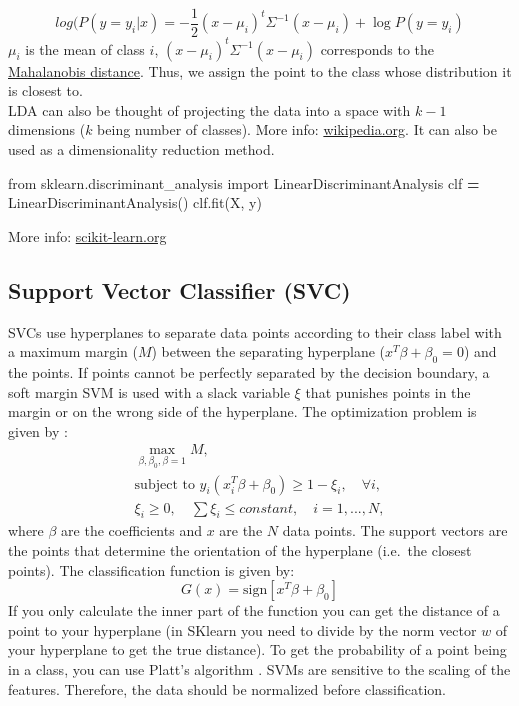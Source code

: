 \documentclass[
]{book}
\newenvironment{Shaded}{\begin{snugshade}}{\end{snugshade}}
\newcommand{\ImportTok}[1]{#1}
\newcommand{\NormalTok}[1]{#1}
\newcommand{\OperatorTok}[1]{\textcolor[rgb]{0.81,0.36,0.00}{\textbf{#1}}}
\begin{document}
\[log(P(y=y_i|x) = - \frac{1}{2} (x-\mu_i)^t \Sigma^{-1}(x-\mu_i)+\log P(y=y_i)\]
\(\mu_i\) is the mean of class \(i\), \((x-\mu_i)^t \Sigma^{-1}(x-\mu_i)\)
corresponds to the \href{https://en.wikipedia.org/wiki/Mahalanobis_distance}{Mahalanobis
distance}. Thus, we
assign the point to the class whose distribution it is closest to.\\
LDA can also be thought of projecting the data into a space with \(k-1\)
dimensions (\(k\) being number of classes). More info:
\href{https://en.wikipedia.org/wiki/Linear_discriminant_analysis}{wikipedia.org}.
It can also be used as a dimensionality reduction method.

\begin{Shaded}
\begin{Highlighting}[]
\ImportTok{from}\NormalTok{ sklearn.discriminant\_analysis }\ImportTok{import}\NormalTok{ LinearDiscriminantAnalysis}
\NormalTok{clf }\OperatorTok{=}\NormalTok{ LinearDiscriminantAnalysis()}
\NormalTok{clf.fit(X, y)}
\end{Highlighting}
\end{Shaded}

More info:
\href{https://scikit-learn.org/stable/modules/generated/sklearn.discriminant_analysis.LinearDiscriminantAnalysis.html}{scikit-learn.org}\\

\hypertarget{support-vector-classifier-svc}{%
\subsection{Support Vector Classifier (SVC)}\label{support-vector-classifier-svc}}

SVCs use hyperplanes to separate data points according to their class
label with a maximum margin (\(M\)) between the separating hyperplane
(\(x^T\beta + \beta_0=0\)) and the points. If points cannot be perfectly
separated by the decision boundary, a soft margin SVM is used with a
slack variable \(\xi\) that punishes points in the margin or on the wrong
side of the hyperplane. The optimization problem is given by
\citep{Hastie2009} : \[\begin{split}
            \max_{\beta, \beta_0, \beta=1} M, \\
            \text{subject to } y_i(x_i^T \beta + \beta_0) \ge 1 - \xi_i, \quad \forall i, \\\xi_i \ge 0, \quad \sum \xi_i \le constant, \quad i= 1, ..., N, 
        \end{split}\] where \(\beta\) are the coefficients and \(x\) are the
\(N\) data points. The support vectors are the points that determine the
orientation of the hyperplane (i.e.~the closest points). The
classification function is given by:
\[G(x) = \text{sign}[x^T\beta + \beta_0]\] If you only calculate the
inner part of the function you can get the distance of a point to your
hyperplane (in SKlearn you need to divide by the norm vector \(w\) of your
hyperplane to get the true distance). To get the probability of a point
being in a class, you can use Platt's algorithm \citep{Platt1999}. SVMs are
sensitive to the scaling of the features. Therefore, the data should be
normalized before classification.\\
\end{document}
